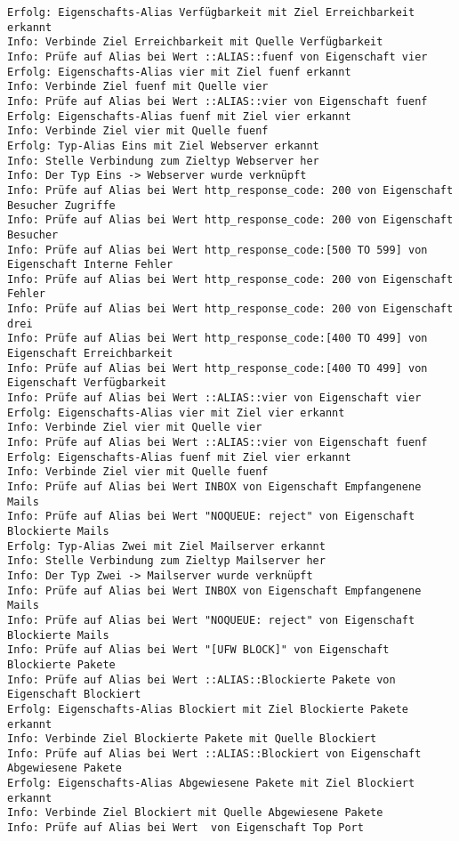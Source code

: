 \begin{lstlisting}[caption={Konsolenausgabe beim Start des Programms}, label=log-start, xleftmargin=6mm]
Erfolg: Eigenschafts-Alias Verfügbarkeit mit Ziel Erreichbarkeit erkannt 
Info: Verbinde Ziel Erreichbarkeit mit Quelle Verfügbarkeit 
Info: Prüfe auf Alias bei Wert ::ALIAS::fuenf von Eigenschaft vier 
Erfolg: Eigenschafts-Alias vier mit Ziel fuenf erkannt 
Info: Verbinde Ziel fuenf mit Quelle vier 
Info: Prüfe auf Alias bei Wert ::ALIAS::vier von Eigenschaft fuenf 
Erfolg: Eigenschafts-Alias fuenf mit Ziel vier erkannt 
Info: Verbinde Ziel vier mit Quelle fuenf 
Erfolg: Typ-Alias Eins mit Ziel Webserver erkannt 
Info: Stelle Verbindung zum Zieltyp Webserver her 
Info: Der Typ Eins -> Webserver wurde verknüpft 
Info: Prüfe auf Alias bei Wert http_response_code: 200 von Eigenschaft Besucher Zugriffe 
Info: Prüfe auf Alias bei Wert http_response_code: 200 von Eigenschaft Besucher 
Info: Prüfe auf Alias bei Wert http_response_code:[500 TO 599] von Eigenschaft Interne Fehler 
Info: Prüfe auf Alias bei Wert http_response_code: 200 von Eigenschaft Fehler 
Info: Prüfe auf Alias bei Wert http_response_code: 200 von Eigenschaft drei 
Info: Prüfe auf Alias bei Wert http_response_code:[400 TO 499] von Eigenschaft Erreichbarkeit 
Info: Prüfe auf Alias bei Wert http_response_code:[400 TO 499] von Eigenschaft Verfügbarkeit 
Info: Prüfe auf Alias bei Wert ::ALIAS::vier von Eigenschaft vier 
Erfolg: Eigenschafts-Alias vier mit Ziel vier erkannt 
Info: Verbinde Ziel vier mit Quelle vier 
Info: Prüfe auf Alias bei Wert ::ALIAS::vier von Eigenschaft fuenf 
Erfolg: Eigenschafts-Alias fuenf mit Ziel vier erkannt 
Info: Verbinde Ziel vier mit Quelle fuenf 
Info: Prüfe auf Alias bei Wert INBOX von Eigenschaft Empfangenene Mails 
Info: Prüfe auf Alias bei Wert "NOQUEUE: reject" von Eigenschaft Blockierte Mails 
Erfolg: Typ-Alias Zwei mit Ziel Mailserver erkannt 
Info: Stelle Verbindung zum Zieltyp Mailserver her 
Info: Der Typ Zwei -> Mailserver wurde verknüpft 
Info: Prüfe auf Alias bei Wert INBOX von Eigenschaft Empfangenene Mails 
Info: Prüfe auf Alias bei Wert "NOQUEUE: reject" von Eigenschaft Blockierte Mails 
Info: Prüfe auf Alias bei Wert "[UFW BLOCK]" von Eigenschaft Blockierte Pakete 
Info: Prüfe auf Alias bei Wert ::ALIAS::Blockierte Pakete von Eigenschaft Blockiert 
Erfolg: Eigenschafts-Alias Blockiert mit Ziel Blockierte Pakete erkannt 
Info: Verbinde Ziel Blockierte Pakete mit Quelle Blockiert 
Info: Prüfe auf Alias bei Wert ::ALIAS::Blockiert von Eigenschaft Abgewiesene Pakete 
Erfolg: Eigenschafts-Alias Abgewiesene Pakete mit Ziel Blockiert erkannt 
Info: Verbinde Ziel Blockiert mit Quelle Abgewiesene Pakete 
Info: Prüfe auf Alias bei Wert  von Eigenschaft Top Port 

\end{lstlisting}
